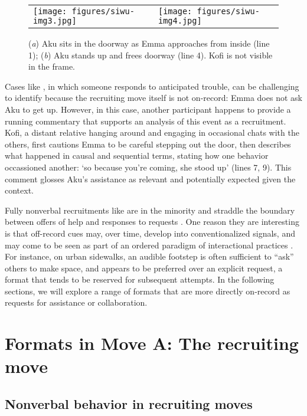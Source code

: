 \documentclass[output=paper]{langsci/langscibook}
\begin{document}
\begin{figure}
\begin{tabularx}{\textwidth}{ll}
\centering
\texttt{[image: figures/siwu-img3.jpg]} & \texttt{[image: figures/siwu-img4.jpg]}
\end{tabularx}
\caption{(\textit{a}) Aku sits in the doorway as Emma approaches from inside (line 1); (\textit{b}) Aku stands up and frees doorway (line 4). Kofi is not visible in the frame.}
\label{fig:dingemanse:2}
\end{figure}

\normalsize
Cases like , in which someone responds to anticipated trouble, can be challenging to identify because the recruiting move itself is not on-record: Emma does not ask Aku to get up. However, in this case, another participant happens to provide a running commentary that supports an analysis of this event as a recruitment. Kofi, a distant relative hanging around and engaging in occasional chats with the others, first cautions Emma to be careful stepping out the door, then describes what happened in causal and sequential terms, stating how one behavior occassioned another: ‘so because you’re coming, she stood up’ (lines 7, 9). This comment glosses Aku’s assistance as relevant and potentially expected given the context.

\hspace*{-.5mm} Fully nonverbal recruitments like  are in the minority and straddle the boundary between offers of help and responses to requests \citep{Curl2006,couper-kuhlen_what_2014}. One reason they are interesting is that off-record cues may, over time, develop into conventionalized signals, and may come to be seen as part of an ordered paradigm of interactional practices \citep{manrique_suspending_2015}. For instance, on urban sidewalks, an audible footstep is often sufficient to “ask” others to make space, and appears to be preferred over an explicit request, a format that tends to be reserved for subsequent attempts. In the following sections, we will explore a range of formats that are more directly on-record as requests for assistance or collaboration.

\section{Formats in Move A: The recruiting move}

\subsection{Nonverbal behavior in recruiting moves}
\end{document}
